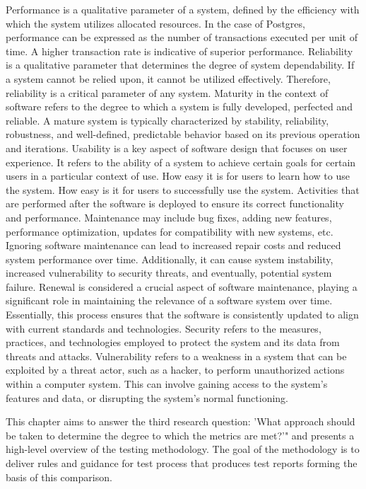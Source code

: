 Performance is a qualitative parameter of a system, defined by the efficiency with which the system utilizes allocated resources. In the case of Postgres, performance can be expressed as the number of transactions executed per unit of time. A higher transaction rate is indicative of superior performance.
Reliability is a qualitative parameter that determines the degree of system dependability. If a system cannot be relied upon, it cannot be utilized effectively. Therefore, reliability is a critical parameter of any system.
Maturity in the context of software refers to the degree to which a system is fully developed, perfected and reliable. A mature system is typically characterized by stability, reliability, robustness, and well-defined, predictable behavior based on its previous operation and iterations.
Usability is a key aspect of software design that focuses on user experience. It refers to the ability of a system to achieve certain goals for certain users in a particular context of use.
How easy it is for users to learn how to use the system.
How easy is it for users to successfully use the system.
Activities that are performed after the software is deployed to ensure its correct functionality and performance. Maintenance may include bug fixes, adding new features, performance optimization, updates for compatibility with new systems, etc. Ignoring software maintenance can lead to increased repair costs and reduced system performance over time. Additionally, it can cause system instability, increased vulnerability to security threats, and eventually, potential system failure.
Renewal is considered a crucial aspect of software maintenance, playing a significant role in maintaining the relevance of a software system over time. Essentially, this process ensures that the software is consistently updated to align with current standards and technologies.
Security refers to the measures, practices, and technologies employed to protect the system and its data from threats and attacks.
Vulnerability refers to a weakness in a system that can be exploited by a threat actor, such as a hacker, to perform unauthorized actions within a computer system. This can involve gaining access to the system's features and data, or disrupting the system's normal functioning.


This chapter aims to answer the third research question: 'What approach should be taken to determine the degree to which the metrics are
met?'" and presents a high-level overview of the testing methodology. The goal of the methodology is to deliver rules and guidance for test process that produces test reports forming the basis of this comparison.

